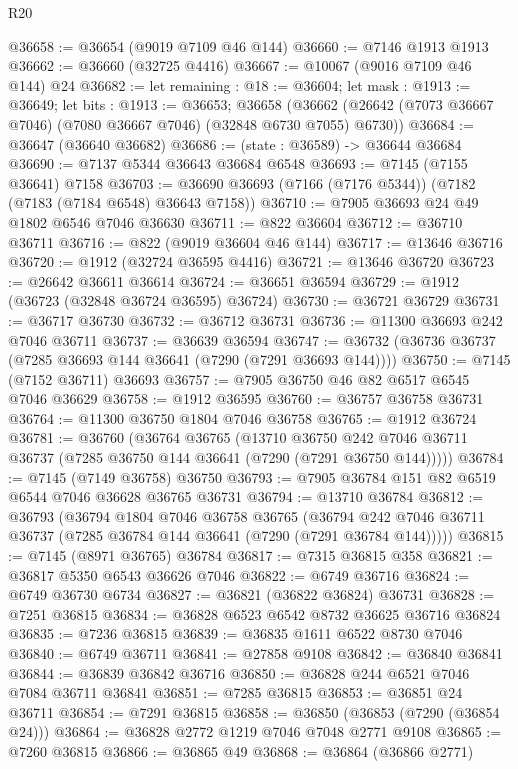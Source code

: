 \begin{lexlean}{R20}
\begin{coremodule}
{@36658 := @36654 (@9019 @7109 @46 @144)
@36660 := @7146 @1913 @1913
@36662 := @36660 (@32725 @4416)
@36667 := @10067 (@9016 @7109 @46 @144) @24
@36682 := let remaining : @18 := @36604;
  let mask : @1913 := @36649;
  let bits : @1913 := @36653;
  @36658 (@36662 (@26642 (@7073 @36667 @7046) (@7080 @36667 @7046) (@32848 @6730 @7055) @6730))
@36684 := @36647 (@36640 @36682)
@36686 := (state : @36589) -> @36644 @36684
@36690 := @7137 @5344 @36643 @36684 @6548
@36693 := @7145 (@7155 @36641) @7158
@36703 := @36690 @36693 (@7166 (@7176 @5344)) (@7182 (@7183 (@7184 @6548) @36643 @7158))
@36710 := @7905 @36693 @24 @49 @1802 @6546 @7046 @36630
@36711 := @822 @36604
@36712 := @36710 @36711
@36716 := @822 (@9019 @36604 @46 @144)
@36717 := @13646 @36716
@36720 := @1912 (@32724 @36595 @4416)
@36721 := @13646 @36720
@36723 := @26642 @36611 @36614
@36724 := @36651 @36594
@36729 := @1912 (@36723 (@32848 @36724 @36595) @36724)
@36730 := @36721 @36729
@36731 := @36717 @36730
@36732 := @36712 @36731
@36736 := @11300 @36693 @242 @7046 @36711
@36737 := @36639 @36594
@36747 := @36732 (@36736 @36737 (@7285 @36693 @144 @36641 (@7290 (@7291 @36693 @144))))
@36750 := @7145 (@7152 @36711) @36693
@36757 := @7905 @36750 @46 @82 @6517 @6545 @7046 @36629
@36758 := @1912 @36595
@36760 := @36757 @36758 @36731
@36764 := @11300 @36750 @1804 @7046 @36758
@36765 := @1912 @36724
@36781 := @36760
    (@36764
      @36765
      (@13710
        @36750
        @242
        @7046
        @36711
        @36737
        (@7285 @36750 @144 @36641 (@7290 (@7291 @36750 @144)))))
@36784 := @7145 (@7149 @36758) @36750
@36793 := @7905 @36784 @151 @82 @6519 @6544 @7046 @36628 @36765 @36731
@36794 := @13710 @36784
@36812 := @36793
    (@36794
      @1804
      @7046
      @36758
      @36765
      (@36794 @242 @7046 @36711 @36737 (@7285 @36784 @144 @36641 (@7290 (@7291 @36784 @144)))))
@36815 := @7145 (@8971 @36765) @36784
@36817 := @7315 @36815 @358
@36821 := @36817 @5350 @6543 @36626 @7046
@36822 := @6749 @36716
@36824 := @6749 @36730 @6734
@36827 := @36821 (@36822 @36824) @36731
@36828 := @7251 @36815
@36834 := @36828 @6523 @6542 @8732 @36625 @36716 @36824
@36835 := @7236 @36815
@36839 := @36835 @1611 @6522 @8730 @7046
@36840 := @6749 @36711
@36841 := @27858 @9108
@36842 := @36840 @36841
@36844 := @36839 @36842 @36716
@36850 := @36828 @244 @6521 @7046 @7084 @36711 @36841
@36851 := @7285 @36815
@36853 := @36851 @24 @36711
@36854 := @7291 @36815
@36858 := @36850 (@36853 (@7290 (@36854 @24)))
@36864 := @36828 @2772 @1219 @7046 @7048 @2771 @9108
@36865 := @7260 @36815
@36866 := @36865 @49
@36868 := @36864 (@36866 @2771)
}
\end{coremodule}
\end{lexlean}

